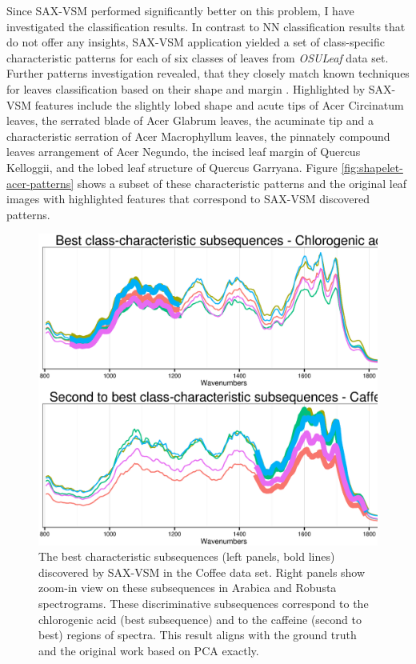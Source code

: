 Since SAX-VSM performed significantly better on this problem, I have investigated the classification results.
In contrast to NN classification results that do not offer any insights, SAX-VSM application yielded a set of 
class-specific characteristic patterns for each of six classes of leaves from \textit{OSULeaf} data set. 
Further patterns investigation revealed, that they closely match known techniques for leaves classification based 
on their shape and margin \cite{citeulike:12134192}. 
Highlighted by SAX-VSM features include 
the slightly lobed shape and acute tips of Acer Circinatum leaves, 
the serrated blade of Acer Glabrum leaves, 
the acuminate tip and a characteristic serration of Acer Macrophyllum leaves, 
the pinnately compound leaves arrangement of Acer Negundo, 
the incised leaf margin of Quercus Kelloggii, 
and the lobed leaf structure of Quercus Garryana. 
Figure \ref{fig:shapelet-acer-patterns} shows a subset of these characteristic patterns and the original
leaf images with highlighted features that correspond to SAX-VSM discovered patterns.

\begin{figure}[!h!t]
   \centering
   \includegraphics[width=120mm]{figures/coffee_patterns.ps}
   \caption{
   The best characteristic subsequences (left panels, bold lines) discovered by SAX-VSM in
   the {Coffee data set}. Right panels show zoom-in view on these subsequences in Arabica
   and Robusta spectrograms.
   These discriminative subsequences correspond to the chlorogenic acid (best subsequence) 
   and to the caffeine (second to best) regions of spectra. This result aligns with
   the ground truth and the original work based on PCA \cite{citeulike:12550833} exactly.  }
   \label{fig:coffee}
\end{figure}

